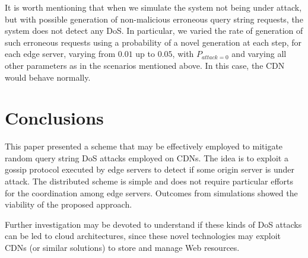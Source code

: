 \documentclass{IEEEtran}
\begin{document}
It is worth mentioning that when we simulate the system not being under attack, but with possible generation of non-malicious erroneous query string requests, the system does not detect any DoS. In particular, we varied the rate of generation of such erroneous requests using a probability of a novel generation at each step, for each edge server, varying from $0.01$ up to $0.05$, with $P_{attack=0}$ and varying all other parameters as in the scenarios mentioned above. In this case, the CDN would behave normally.


\section{Conclusions}
\label{sec:conc}

This paper presented a scheme that may be effectively employed to mitigate random query string DoS attacks employed on CDNs. 
The idea is to exploit a gossip protocol executed by edge servers to detect if some origin server is under attack. The distributed scheme is simple and does not require particular efforts for the coordination among edge servers. 
Outcomes from simulations showed the viability of the proposed approach.

Further investigation may be devoted to understand if these kinds of DoS attacks can be led to cloud architectures, since these novel technologies may exploit CDNs (or similar solutions) to store and manage Web resources.
\end{document}
